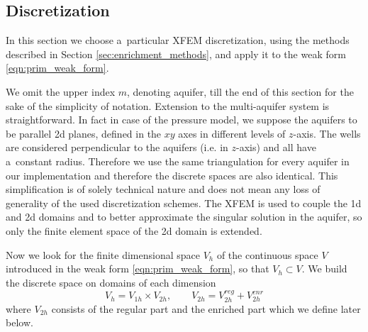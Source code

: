 \subsection{Discretization}
\label{sec:prim_discretization}
In this section we choose a~particular XFEM discretization, using the methods described in Section \ref{sec:enrichment_methods},
and apply it to the weak form \eqref{eqn:prim_weak_form}.

We omit the upper index $m$, denoting aquifer, till the end of this section for the sake of the simplicity of notation.
Extension to the multi-aquifer system is straightforward. In fact in case of the pressure model, we suppose the aquifers
to be parallel 2d planes, defined in the $xy$ axes in different levels of $z$-axis. 
The wells are considered perpendicular to the aquifers (i.e. in $z$-axis) and all have a~constant radius.
Therefore we use the same triangulation for every aquifer in our implementation and therefore the discrete spaces are also identical.
This simplification is of solely technical nature and does not mean any loss of generality of the used discretization schemes.
The XFEM is used to couple the 1d and 2d domains and to better approximate the singular solution in the aquifer,
so only the finite element space of the 2d domain is extended.

Now we look for the finite dimensional space $V_h$ of the continuous space $V$ introduced in the weak form \eqref{eqn:prim_weak_form},
so that $V_h\subset V$. We build the discrete space on domains of each dimension
\begin{equation}
    V_h = V_{1h} \times V_{2h}, \qquad V_{2h} = V_{2h}^{reg} + V_{2h}^{enr}
\end{equation}
where $V_{2h}$ consists of the regular part and the enriched part which we define later below.

